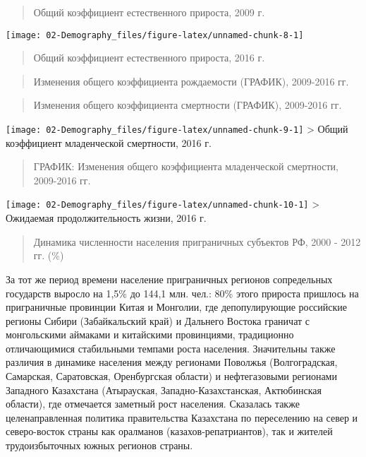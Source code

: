 \documentclass[]{book}
\begin{document}
\begin{quote}
Общий коэффициент естественного прироста, 2009 г.
\end{quote}

\texttt{[image: 02-Demography\_files/figure-latex/unnamed-chunk-8-1]}

\begin{quote}
Общий коэффициент естественного прироста, 2016 г.
\end{quote}

\begin{quote}
Изменения общего коэффициента рождаемости (ГРАФИК), 2009-2016 гг.
\end{quote}

\begin{quote}
Изменения общего коэффициента смертности (ГРАФИК), 2009-2016 гг.
\end{quote}

\texttt{[image: 02-Demography\_files/figure-latex/unnamed-chunk-9-1]}
\textgreater{} Общий коэффициент младенческой смертности, 2016 г.

\begin{quote}
ГРАФИК: Изменения общего коэффициента младенческой смертности, 2009-2016
гг.
\end{quote}

\texttt{[image: 02-Demography\_files/figure-latex/unnamed-chunk-10-1]}
\textgreater{} Ожидаемая продолжительность жизни, 2016 г.

\begin{quote}
Динамика численности населения приграничных субъектов РФ, 2000 - 2012
гг. (\%)
\end{quote}

За тот же период времени население приграничных регионов сопредельных
государств выросло на 1,5\% до 144,1 млн. чел.: 80\% этого прироста
пришлось на приграничные провинции Китая и Монголии, где депопулирующие
российские регионы Сибири (Забайкальский край) и Дальнего Востока
граничат с монгольскими аймаками и китайскими провинциями, традиционно
отличающимися стабильными темпами роста населения. Значительны также
различия в динамике населения между регионами Поволжья (Волгоградская,
Самарская, Саратовская, Оренбургская области) и нефтегазовыми регионами
Западного Казахстана (Атырауская, Западно-Казахстанская, Актюбинская
области), где отмечается заметный рост населения. Сказалась также
целенаправленная политика правительства Казахстана по переселению на
север и северо-восток страны как оралманов (казахов-репатриантов), так и
жителей трудоизбыточных южных регионов страны.
\end{document}
